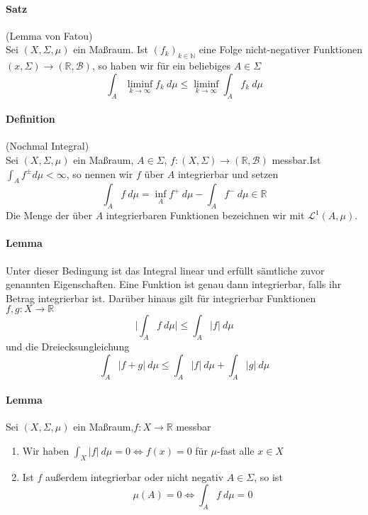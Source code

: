 \documentclass[12pt,a4paper,fleqn]{article}
\begin{document}
\paragraph{Satz} (Lemma von Fatou)\\
Sei $(X, \Sigma, \mu)$ ein Maßraum. Ist $(f_k)_{k \in \mathbb{N}}$ eine Folge nicht-negativer Funktionen\linebreak ${(x, \Sigma) \rightarrow (\mathbb{R}, \mathcal{B})}$, so haben wir für ein beliebiges $A \in \Sigma$
\begin{displaymath}
\int_A \liminf_{k \rightarrow \infty} f_k\ d\mu \leq \liminf_{k \rightarrow \infty} \int_A f_k\ d\mu 
\end{displaymath}

\paragraph{Definition} (Nochmal Integral)\\
Sei $(X, \Sigma, \mu)$ ein Maßraum,  $A \in \Sigma$, $f\colon(X, \Sigma) \rightarrow (\mathbb{R}, \mathcal{B})$ messbar.Ist $\int_A f^\pm d\mu < \infty$, so nennen wir $f$ über $A$ integrierbar und setzen
\begin{displaymath}
\int_A f\ d\mu = \inf_A f^+\ d\mu - \int_A f^-\ d\mu \in \mathbb{R}
\end{displaymath}
Die Menge der über $A$ integrierbaren Funktionen bezeichnen wir mit $\mathscr{L}^1(A, \mu)$.

\paragraph{Lemma} Unter dieser Bedingung ist das Integral linear und erfüllt sämtliche zuvor genannten Eigenschaften. Eine Funktion ist genau dann integrierbar, falls ihr Betrag integrierbar ist. Darüber hinaus gilt für integrierbar Funktionen $f, g\colon X \rightarrow \mathbb{R}$
\begin{displaymath}
\bigg|{\int_A f\ d\mu}\bigg| \leq \int_A \vert{f}\vert\ d\mu 
\end{displaymath}
und die Dreiecksungleichung
\begin{displaymath}
\int_A \vert{f + g}\vert\ d\mu \leq \int_A \vert{f}\vert\ d\mu + \int_A \vert{g}\vert\ d\mu
\end{displaymath}

\paragraph{Lemma} Sei $(X, \Sigma, \mu)$ ein Maßraum,$f\colon X \rightarrow \mathbb{R}$ messbar
\begin{enumerate}
\item Wir haben $\int_X \vert{f}\vert\ d\mu = 0 \Leftrightarrow f(x) = 0$ für $\mu$-fast alle $x \in X$
\item Ist $f$ außerdem integrierbar oder nicht negativ $A \in \Sigma$, so ist 
\begin{displaymath}
\mu(A) = 0 \Leftrightarrow \int_A f\ d\mu = 0
\end{displaymath}
\end{enumerate}
\end{document}
